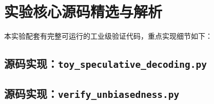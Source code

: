 \section{实验核心源码精选与解析}

本实验配套有完整可运行的工业级验证代码，重点实现细节如下：


\subsection{源码实现：\texttt{toy\_speculative\_decoding.py}}




\subsection{源码实现：\texttt{verify\_unbiasedness.py}}




